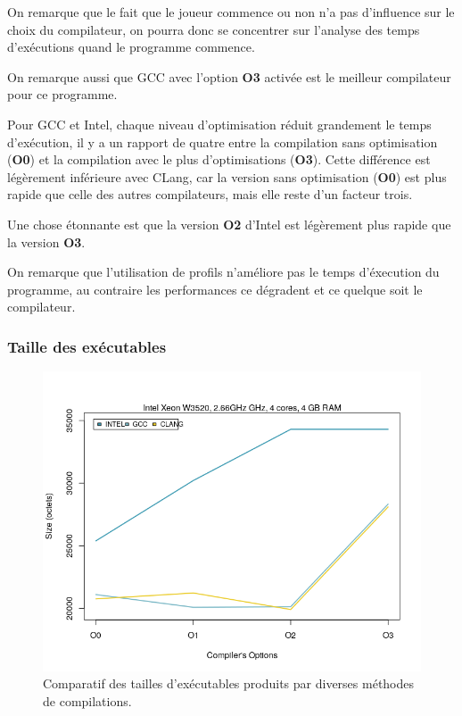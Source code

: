 \documentclass[
 aip,
 jmp,
 amsmath,amssymb,
 reprint
]{revtex4-1}
\begin{document}
On remarque que le fait que le joueur commence\pageref{Fig:temps_exec_j1} ou non\pageref{Fig:temps_exec_j2} n'a pas d'influence sur le choix du compilateur, on pourra donc se concentrer sur l'analyse des temps d'exécutions quand le programme commence.\par
On remarque aussi que GCC avec l'option \textbf{O3} activée est le meilleur compilateur pour ce programme.\par
Pour GCC et Intel, chaque niveau d'optimisation réduit grandement le temps d'exécution, il y a un rapport de quatre entre la compilation sans optimisation (\textbf{O0}) et la compilation avec le plus d'optimisations (\textbf{O3}). Cette différence est légèrement inférieure avec CLang, car la version sans optimisation (\textbf{O0}) est plus rapide que celle des autres compilateurs, mais elle reste d'un facteur trois.\par
Une chose étonnante est que la version \textbf{O2} d'Intel est légèrement plus rapide que la version \textbf{O3}.\par
On remarque que l'utilisation de profils n'améliore pas le temps d'éxecution du programme, au contraire les performances ce dégradent et ce quelque soit le compilateur.

\subsubsection{Taille des exécutables}
\begin{figure}[H]
  \includegraphics[width=\linewidth, keepaspectratio=true]{tailles.png}
  \caption{Comparatif des tailles d'exécutables produits par diverses méthodes de compilations.\label{Fig:taille_executables_seq}}
\end{figure}
\end{document}
